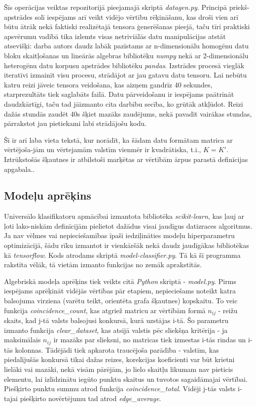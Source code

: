 \documentclass[12pt, a4paper]{article}
\begin{document}
Šīs operācijas veiktas repozitorijā pieejamajā skriptā \textit{datagen.py}. Principā
priekš-apstrādes solī iespējams arī veikt vidējo vērtību rēķināšanu, kas droši vien arī būtu ātrāk nekā faktiski realizētajā tensora ģenerēšanas pieejā, taču tīri praktiski apsvērumu vadībā tika izlemts visas netriviālās datu manipulācijas atstāt atsevišķi: darba autors daudz labāk pazīstams ar n-dimensionālu homogēnu datu bloku skaitļošanas un lineārās algebras bibliotēku \textit{numpy} nekā ar 2-dimensionālu heterogēnu datu korpusu apstrādes bibliotēku \textit{pandas}. Izstrādes procesā vieglāk iteratīvi izmainīt visu procesu, strādājot ar jau gatavu datu tensoru. Lai nebūtu katru reizi jāveic tensora veidošana, kas aizņem gandrīz 40 sekundes, starprezultāts tiek saglabāts failā. Datu pārveidošanu ir iespējams paātrināt daudzkārtīgi, taču tad jāizmanto cita darbību secība, ko grūtāk atkļūdot. Reizi dažās stundās zaudēt 40s šķiet mazāks zaudējums, nekā pavadīt vairākas stundas, pārrakstot jau pietiekami labi strādājošu kodu. 

Šī ir arī laba vieta tekstā, kur norādīt, ka šādam datu formātam matrica ar vērtējoša-jām un vērtejamām valstīm vienmēr ir kvadrātiska, t.i., $K = K'$. Iztrūkstošās šķautnes ir atbilstoši marķētas ar vērtībām ārpus parastā definīcijas apgabala..

\subsection{Modeļu aprēķins}

Universālo klasifikatoru apmācībai izmantota bibliotēka \textit{scikit-learn}, kas ļauj ar ļoti lako-niskām definīcijām pielietot dažādus visai jaudīgus datizraces algoritmus. Ja nav vēlmes vai nepieciešamības īpaši iedziļināties modeļu hiperparametru optimizācijā, šādu rīku izmantot ir vienkāršāk nekā daudz jaudīgākas bibliotēkas kā \textit{tensorflow}. Kods atrodams skriptā \textit{model-classifier.py}. Tā kā šī programma rakstīta vēlāk, tā vietām izmanto funkcijas no zemāk aprakstītās.


Algebriskā modeļa aprēķins tiek veikts citā \textit{Python} skriptā - \textit{model.py}. Pirms iespējams aprēķināt vidējās vērtības pār etapiem, nepieciešams noteikt katra balsojuma virziena (varētu teikt, orientēta grafa šķautnes) kopskaitu. To veic funkcija \textit{coincidence\_count}, kas atgriež matricu ar vērtībām formā $n_{ij}$ - reižu skaits, kad j-tā valsts balsojusi konkursā, kurā uzstājas i-tā. Šo parametru izmanto funkcija \textit{clear\_dataset}, kas atsijā valstis pēc sliekšņa kritērija - ja maksimālais $n_{ij}$ ir mazāks par slieksni, no matricas tiek izmestas i-tās rindas un i-tās kolonnas. Tādējādi tiek apkarota traucējoša parādība - valstīm, kas piedalījušās konkursā tikai dažas reizes, korekcijas koeficienti var būt krietni lielāki vai mazāki, nekā visām pārējām, jo lielo skaitļu likumam nav pieticis elementu, lai izlīdzinātu iegūto punktu skaitus un tuvotos sagaidāmajai vērtībai. Piešķirto punktu summu atrod funkcija \textit{coincidence\_total}. Vidēji j-tās valsts i-tajai piešķirto novērtējumu tad atrod \textit{edge\_average}. 
\end{document}
